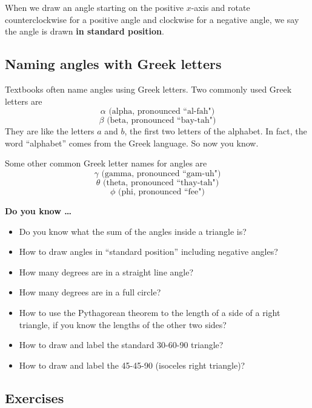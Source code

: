 When we draw an angle starting on the positive $x$-axis and rotate counterclockwise for a positive angle and clockwise for a negative angle, we say the angle is drawn \textbf{in standard position}.

\subsection*{Naming angles with Greek letters}

Textbooks often name angles using Greek letters. Two commonly used Greek letters are
$$\alpha \text{ (alpha, pronounced ``al-fah")}$$
$$\beta \text{ (beta, pronounced ``bay-tah")}$$ 
They are like the letters $a$ and $b$, the first two letters of the alphabet.  In fact, the word ``alphabet'' comes from the Greek language.  So now you know. 

Some other common Greek letter names for angles are
$$\gamma \text{ (gamma, pronounced ``gam-uh")}$$
$$\theta \text{ (theta, pronounced ``thay-tah")}$$
$$\phi \text{ (phi, pronounced ``fee")}$$

 

\noindent \textbf{Do you know \ldots}

\begin{itemize}
\item Do you know what the sum of the angles inside a triangle is?
\item How to draw angles in ``standard position'' including negative angles?
\item How many degrees are in a straight line angle?
\item How many degrees are in a full circle?
\item How to use the Pythagorean theorem to the length of a side of a right triangle, if you know the lengths of the other two sides?
\item How to draw and label the standard 30-60-90 triangle?
\item How to draw and label the 45-45-90 (isoceles right triangle)?
  
\end{itemize}

\subsection*{Exercises}

